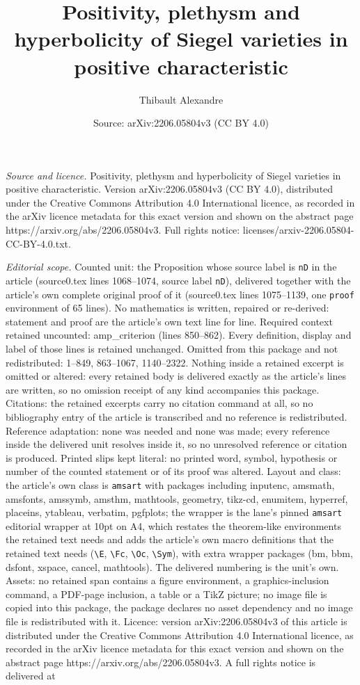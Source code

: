\documentclass[10pt,a4paper]{amsart}
\title[Positivity, plethysm and hyperbolicity of Siegel varieties i]{Positivity, plethysm and hyperbolicity of Siegel varieties in positive characteristic}
\author{Thibault Alexandre}
\date{Source: arXiv:2206.05804v3 (CC BY 4.0)}
\begin{document}
\maketitle

\noindent\emph{Source and licence.} Positivity, plethysm and hyperbolicity of Siegel varieties in positive characteristic. Version arXiv:2206.05804v3 (CC BY 4.0), distributed under the Creative Commons Attribution 4.0 International licence, as recorded in the arXiv licence metadata for this exact version and shown on the abstract page https://arxiv.org/abs/2206.05804v3. Full rights notice: licenses/arxiv-2206.05804-CC-BY-4.0.txt.\par\smallskip

\noindent\textit{Editorial scope.} Counted unit: the Proposition whose source label is \texttt{nD} in the article (source0.tex lines 1068--1074, source label \texttt{nD}), delivered together with the article's own complete original proof of it (source0.tex lines 1075--1139, one \texttt{proof} environment of 65 lines). No mathematics is written, repaired or re-derived: statement and proof are the article's own text line for line. Required context retained uncounted: amp\_criterion (lines 850--862). Every definition, display and label of those lines is retained unchanged. Omitted from this package and not redistributed: 1--849, 863--1067, 1140--2322. Nothing inside a retained excerpt is omitted or altered: every retained body is delivered exactly as the article's lines are written, so no omission receipt of any kind accompanies this package. Citations: the retained excerpts carry no citation command at all, so no bibliography entry of the article is transcribed and no reference is redistributed. Reference adaptation: none was needed and none was made; every reference inside the delivered unit resolves inside it, so no unresolved reference or citation is produced. Printed slips kept literal: no printed word, symbol, hypothesis or number of the counted statement or of its proof was altered. Layout and class: the article's own class is \texttt{amsart} with packages including inputenc, amsmath, amsfonts, amssymb, amsthm, mathtools, geometry, tikz-cd, enumitem, hyperref, placeins, ytableau, verbatim, pgfplots; the wrapper is the lane's pinned \texttt{amsart} editorial wrapper at 10pt on A4, which restates the theorem-like environments the retained text needs and adds the article's own macro definitions that the retained text needs (\texttt{\textbackslash E}, \texttt{\textbackslash Fc}, \texttt{\textbackslash Oc}, \texttt{\textbackslash Sym}), with extra wrapper packages (bm, bbm, dsfont, xspace, cancel, mathtools). The delivered numbering is the unit's own. Assets: no retained span contains a figure environment, a graphics-inclusion command, a PDF-page inclusion, a table or a TikZ picture; no image file is copied into this package, the package declares no asset dependency and no image file is redistributed with it. Licence: version arXiv:2206.05804v3 of this article is distributed under the Creative Commons Attribution 4.0 International licence, as recorded in the arXiv licence metadata for this exact version and shown on the abstract page https://arxiv.org/abs/2206.05804v3. A full rights notice is delivered at 
\end{document}
